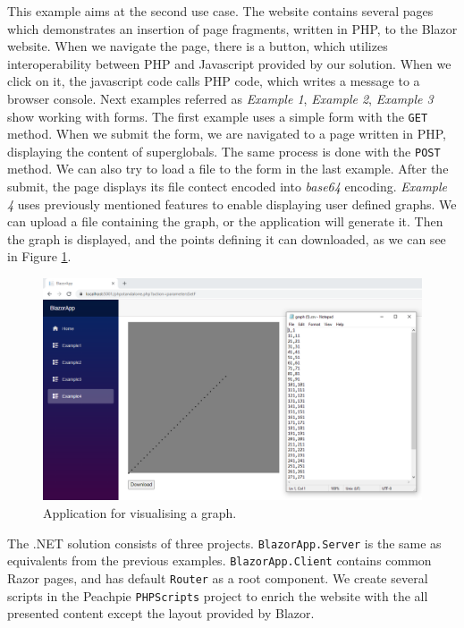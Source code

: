 This example aims at the second use case.
The website contains several pages which demonstrates an insertion of page fragments, written in PHP, to the Blazor website.
When we navigate the page, there is a button, which utilizes interoperability between PHP and Javascript provided by our solution.
When we click on it, the javascript code calls PHP code, which writes a message to a browser console.
Next examples referred as \textit{Example 1}, \textit{Example 2}, \textit{Example 3} show working with forms.
The first example uses a simple form with the \texttt{GET} method.
When we submit the form, we are navigated to a page written in PHP, displaying the content of superglobals.
The same process is done with the \texttt{POST} method.
We can also try to load a file to the form in the last example.
After the submit, the page displays its file contect encoded into \textit{base64} encoding.
\textit{Example 4} uses previously mentioned features to enable displaying user defined graphs.
We can upload a file containing the graph, or the application will generate it.
Then the graph is displayed, and the points defining it can downloaded, as we can see in Figure \ref{img27:graph}.
\par
\begin{figure}[b!]
\centering
\includegraphics[scale=0.4]{./img/graph}
\caption{Application for visualising a graph.}
\label{img27:graph}
\end{figure} 
\par
The .NET solution consists of three projects.
\texttt{BlazorApp.Server} is the same as equivalents from the previous examples.
\texttt{BlazorApp.Client} contains common Razor pages, and has default \texttt{Router} as a root component.
We create several scripts in the Peachpie \texttt{PHPScripts} project to enrich the website with the all presented content except the layout provided by Blazor.
